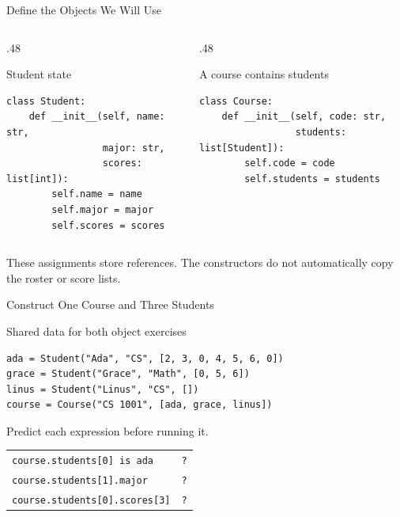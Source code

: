 \documentclass[aspectratio=169,10pt]{beamer}
\begin{document}
\begin{frame}[fragile]{Define the Objects We Will Use}
\small
\begin{columns}[T,onlytextwidth]
\begin{column}{.48\textwidth}
\begin{block}{Student state}
\footnotesize
\begin{verbatim}
class Student:
    def __init__(self, name: str,
                 major: str,
                 scores: list[int]):
        self.name = name
        self.major = major
        self.scores = scores
\end{verbatim}
\end{block}
\end{column}
\begin{column}{.48\textwidth}
\begin{block}{A course contains students}
\footnotesize
\begin{verbatim}
class Course:
    def __init__(self, code: str,
                 students: list[Student]):
        self.code = code
        self.students = students
\end{verbatim}
\end{block}
\end{column}
\end{columns}
\begin{keyidea}These assignments store references. The constructors do not automatically copy the roster or score lists.\end{keyidea}
\end{frame}

\begin{frame}[fragile]{Construct One Course and Three Students}
\small
\begin{block}{Shared data for both object exercises}
\footnotesize
\begin{verbatim}
ada = Student("Ada", "CS", [2, 3, 0, 4, 5, 6, 0])
grace = Student("Grace", "Math", [0, 5, 6])
linus = Student("Linus", "CS", [])
course = Course("CS 1001", [ada, grace, linus])
\end{verbatim}
\end{block}
\begin{activity}Predict each expression before running it.\end{activity}
\begin{center}
\begin{tabular}{ll}
\texttt{course.students[0] is ada} & \texttt{?}\\
\texttt{course.students[1].major} & \texttt{?}\\
\texttt{course.students[0].scores[3]} & \texttt{?}
\end{tabular}
\end{center}
\end{frame}
\end{document}
